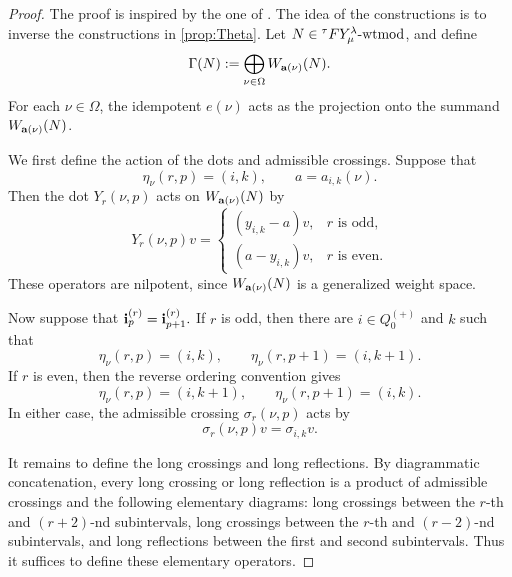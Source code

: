 \begin{proof}
The proof is inspired by the one of \cite[Lem. 5.18]{KTWWY19}.
The idea of the constructions is to inverse the constructions in \cref{prop:Theta}. Let
\(N\in{}^\tau F Y_\mu^\lambda\text{-wtmod}\), and define
\[
   \Gamma(N)
   :=
   \bigoplus_{\nu\in\Omega}W_{\mathbf{a}(\nu)}(N).
\]
For each \(\nu\in\Omega\), the idempotent \(e(\nu)\) acts as the
projection onto the summand \(W_{\mathbf{a}(\nu)}(N)\).

We first define the action of the dots and admissible crossings. Suppose that
\[
   \eta_\nu(r,p)=(i,k),
   \qquad
   a=a_{i,k}(\nu).
\]
Then the dot \(Y_r(\nu,p)\) acts on \(W_{\mathbf{a}(\nu)}(N)\) by
\begin{equation}
\label{eq:Gamma-dot}
   Y_r(\nu,p)v
   =
   \begin{cases}
      (y_{i,k}-a)v, & r\text{ is odd},\\[1mm]
      (a-y_{i,k})v, & r\text{ is even}.
   \end{cases}
\end{equation}
These operators are nilpotent, since \(W_{\mathbf{a}(\nu)}(N)\) is a generalized
weight space.

Now suppose that
\(
\mathbf{i}^{(r)}_p=\mathbf{i}^{(r)}_{p+1}.
\)
If \(r\) is odd, then there are \(i\in Q_0^{(+)}\) and \(k\) such that
\[
   \eta_\nu(r,p)=(i,k),
   \qquad
   \eta_\nu(r,p+1)=(i,k+1).
\]
If \(r\) is even, then the reverse ordering convention gives
\[
   \eta_\nu(r,p)=(i,k+1),
   \qquad
   \eta_\nu(r,p+1)=(i,k).
\]
In either case, the admissible crossing \(\sigma_r(\nu,p)\) acts by
\begin{equation}
\label{eq:Gamma-short-cross}
   \sigma_r(\nu,p)v=\sigma_{i,k}v.
\end{equation}

It remains to define the long crossings and long reflections. By
diagrammatic concatenation, every long crossing or long reflection is a
product of admissible crossings and the following elementary diagrams:
long crossings between the \(r\)-th and \((r+2)\)-nd subintervals, long
crossings between the \(r\)-th and \((r-2)\)-nd subintervals, and long
reflections between the first and second subintervals. Thus it suffices to
define these elementary operators.


\end{proof}
